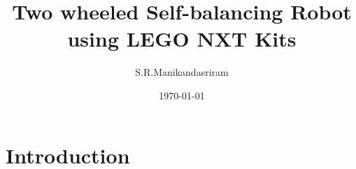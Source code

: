 \documentclass[aspectratio=169]{beamer}
\title[NXTway-GS]{Two wheeled Self-balancing Robot using LEGO NXT Kits} %
\author{S.R.Manikandasriram} %
\institute[IITM] %
{
Indian Institute of Technology, Madras \\ %
\medskip
\textit{srmanikandasriram@gmail.com} %
}
\date{\today} %
\begin{document}
\begin{frame}
\titlepage %
\end{frame}



\section{Introduction} %

\end{document}
